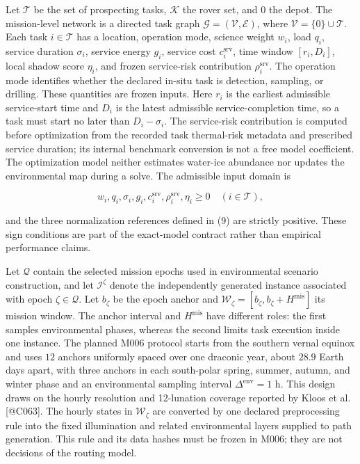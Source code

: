 \documentclass[
  11pt,
]{article}
\begin{document}
Let \(\mathcal{T}\) be the set of prospecting tasks, \(\mathcal{K}\) the
rover set, and \(0\) the depot. The mission-level network is a directed
task graph \(\mathcal{G}=(\mathcal{V},\mathcal{E})\), where
\(\mathcal{V}=\{0\}\cup\mathcal{T}\). Each task \(i\in\mathcal{T}\) has
a location, operation mode, science weight \(w_i\), load \(q_i\),
service duration \(\sigma_i\), service energy \(g_i\), service cost
\(c_i^{\mathrm{srv}}\), time window \([r_i,D_i]\), local shadow score
\(\eta_i\), and frozen service-risk contribution
\(\rho_i^{\mathrm{srv}}\). The operation mode identifies whether the
declared in-situ task is detection, sampling, or drilling. These
quantities are frozen inputs. Here \(r_i\) is the earliest admissible
service-start time and \(D_i\) is the latest admissible
service-completion time, so a task must start no later than
\(D_i-\sigma_i\). The service-risk contribution is computed before
optimization from the recorded task thermal-risk metadata and prescribed
service duration; its internal benchmark conversion is not a free model
coefficient. The optimization model neither estimates water-ice
abundance nor updates the environmental map during a solve. The
admissible input domain is

\[
w_i,q_i,\sigma_i,g_i,c_i^{\mathrm{srv}},\rho_i^{\mathrm{srv}},\eta_i\ge0
\quad(i\in\mathcal T),
\]

and the three normalization references defined in (9) are strictly
positive. These sign conditions are part of the exact-model contract
rather than empirical performance claims.

Let \(\mathcal{Q}\) contain the selected mission epochs used in
environmental scenario construction, and let \(\mathcal{I}^{\zeta}\)
denote the independently generated instance associated with epoch
\(\zeta\in\mathcal{Q}\). Let \(b_\zeta\) be the epoch anchor and
\(\mathcal{W}_\zeta=[b_\zeta,b_\zeta+H^{\mathrm{mis}}]\) its mission
window. The anchor interval and \(H^{\mathrm{mis}}\) have different
roles: the first samples environmental phases, whereas the second limits
task execution inside one instance. The planned M006 protocol starts
from the southern vernal equinox and uses \(12\) anchors uniformly
spaced over one draconic year, about \(28.9\) Earth days apart, with
three anchors in each south-polar spring, summer, autumn, and winter
phase and an environmental sampling interval \(\Delta^{\mathrm{env}}=1\)
h. This design draws on the hourly resolution and 12-lunation coverage
reported by Kloos et al. {[}@C063{]}. The hourly states in
\(\mathcal{W}_\zeta\) are converted by one declared preprocessing rule
into the fixed illumination and related environmental layers supplied to
path generation. This rule and its data hashes must be frozen in M006;
they are not decisions of the routing model.
\end{document}

